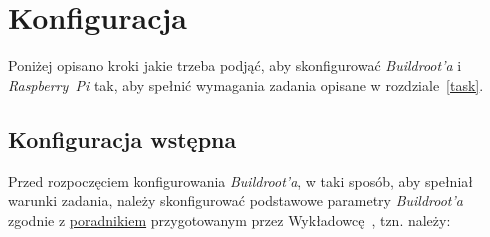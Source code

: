 \documentclass{article}
\begin{document}

\section{Konfiguracja}

Poniżej opisano kroki jakie trzeba podjąć, aby skonfigurować \emph{Buildroot'a} i \emph{Raspberry~Pi} tak, aby spełnić wymagania zadania opisane w rozdziale~\ref{task}.


\subsection{Konfiguracja wstępna}

Przed rozpoczęciem konfigurowania \emph{Buildroot'a}, w taki sposób, aby spełniał warunki zadania, należy skonfigurować podstawowe parametry \emph{Buildroot'a} zgodnie z \href{http://wzab.cba.pl/LINSW/poradnik\_laboratorium.pdf}{poradnikiem} przygotowanym przez Wykładowcę~\cite{www:wzab}, tzn. należy:
\end{document}
